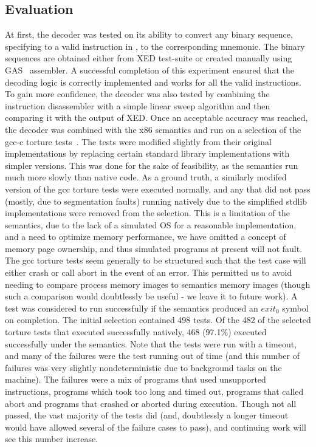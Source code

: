 \subsection{Evaluation}
At first, the decoder was tested on its ability to  convert any binary sequence, specifying to a valid instruction in \ISA, to the corresponding mnemonic. The binary sequences are  obtained either from XED test-suite or created manually using GAS~\cite{gas} assembler. A successful completion of this experiment ensured that the decoding logic is correctly implemented and works for all the valid \ISA instructions. To gain more confidence, the decoder was also tested by combining the instruction disassembler with a simple linear sweep algorithm and then comparing it with the output of XED.  Once an acceptable accuracy was reached, the decoder was combined with the x86 semantics and run on a selection of the gcc-c torture tests~\cite{CTORTURE}.  The tests were modified slightly from their original implementations by replacing certain standard library implementations with simpler versions.  This was done for the sake of feasibility, as the semantics run much more slowly than native code.  As a ground truth, a similarly modifed version of the gcc torture tests were executed normally, and any that did not pass (mostly, due to segmentation faults) running natively due to the simplified stdlib implementations were removed from the selection. This is a limitation of the semantics, due to the lack of a simulated OS for a reasonable implementation, and a need to optimize memory performance, we have omitted a concept of memory page ownership, and thus simulated programs at present will not fault. The gcc torture tests seem generally to be structured such that the test case will either crash or call abort in the event of an error.  This permitted us to avoid needing to compare process memory images to semantics memory images (though such a comparison would doubtlessly be useful - we leave it to future work).  A test was considered to run successfully if the semantics produced an $exit_0$ symbol on completion.  The initial selection contained 498 tests.  Of the 482 of the selected torture tests that executed successfully natively, 468 (97.1\%) executed successfully under the semantics.  Note that the tests were run with a timeout, and many of the failures were the test running out of time (and this number of failures was very slightly nondeterministic due to background tasks on the machine).  The failures were a mix of programs that used unsupported instructions, programs which took too long and timed out, programs that called abort and programs that crashed or aborted during execution.  Though not all passed, the vast majority of the tests did (and, doubtlessly a longer timeout would have allowed several of the failure cases to pass), and continuing work will see this number increase.

